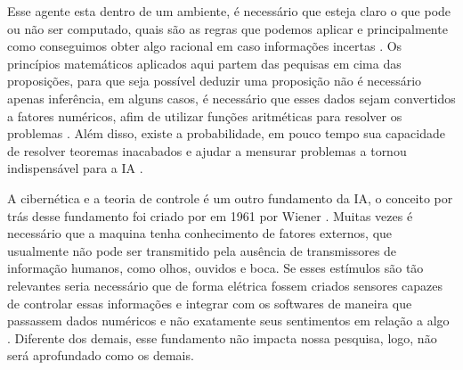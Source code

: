 Esse agente esta dentro de um ambiente, é necessário que esteja claro o que pode ou não ser computado, quais são as regras que podemos aplicar e principalmente como conseguimos obter algo racional em caso informações incertas \cite[7]{russell2003artificial}. Os princípios matemáticos aplicados aqui partem das pequisas em cima das proposições, para que seja possível deduzir uma proposição não é necessário apenas inferência, em alguns casos, é necessário que esses dados sejam convertidos a fatores numéricos, afim de utilizar funções aritméticas para resolver os problemas \cite[2-4]{boole1854investigation}. Além disso, existe a probabilidade, em pouco tempo sua capacidade de resolver teoremas inacabados e ajudar a mensurar problemas a tornou indispensável para a IA \cite[9]{russell2003artificial}.

A cibernética e a teoria de controle é um outro fundamento da IA, o conceito por trás desse fundamento foi criado por em 1961 por Wiener \cite[15]{russell2003artificial}. Muitas vezes é necessário que a maquina tenha conhecimento de fatores externos, que usualmente não pode ser transmitido pela ausência de transmissores de informação humanos, como olhos, ouvidos e boca. Se esses estímulos são tão relevantes seria necessário que de forma elétrica fossem criados sensores capazes de controlar essas informações e integrar com os softwares de maneira que passassem dados numéricos e não exatamente seus sentimentos em relação a algo \cite[3-7]{wiener1961cybernetics}. Diferente dos demais, esse fundamento não impacta nossa pesquisa, logo, não será aprofundado como os demais.

